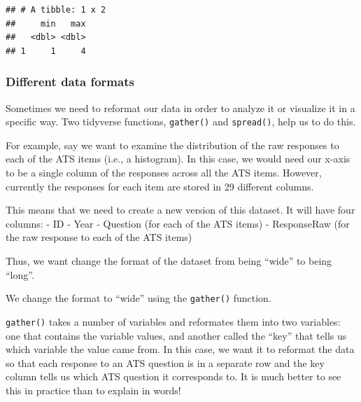 \documentclass[12pt,]{book}
\newenvironment{Shaded}{\begin{snugshade}}{\end{snugshade}}
\newcommand{\KeywordTok}[1]{\textcolor[rgb]{0.13,0.29,0.53}{\textbf{#1}}}
\newcommand{\NormalTok}[1]{#1}
\newcommand{\OperatorTok}[1]{\textcolor[rgb]{0.81,0.36,0.00}{\textbf{#1}}}
\newcommand{\StringTok}[1]{\textcolor[rgb]{0.31,0.60,0.02}{#1}}
\begin{document}
\begin{Shaded}
\end{Shaded}

\begin{verbatim}
## # A tibble: 1 x 2
##     min   max
##   <dbl> <dbl>
## 1     1     4
\end{verbatim}

\hypertarget{different-data-formats}{%
\subsubsection{Different data formats}\label{different-data-formats}}

Sometimes we need to reformat our data in order to analyze it or visualize it in a specific way. Two tidyverse functions, \texttt{gather()} and \texttt{spread()}, help us to do this.

For example, say we want to examine the distribution of the raw responses to each of the ATS items (i.e., a histogram). In this case, we would need our x-axis to be a single column of the responses across all the ATS items. However, currently the responses for each item are stored in 29 different columns.

This means that we need to create a new version of this dataset. It will have four columns:
- ID
- Year
- Question (for each of the ATS items)
- ResponseRaw (for the raw response to each of the ATS items)

Thus, we want change the format of the dataset from being ``wide'' to being ``long''.

We change the format to ``wide'' using the \texttt{gather()} function.

\texttt{gather()} takes a number of variables and reformates them into two variables: one that contains the variable values, and another called the ``key'' that tells us which variable the value came from. In this case, we want it to reformat the data so that each response to an ATS question is in a separate row and the key column tells us which ATS question it corresponds to. It is much better to see this in practice than to explain in words!
\end{document}
